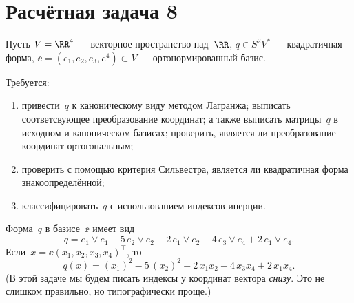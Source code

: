\section{Расчётная задача 8}

Пусть $V = \RR^4$ --- векторное пространство над~$\RR$, $q \in S^2V^*$ --- квадратичная форма, $\ee = (e_1, e_2, e_3, e^4) \subset V$ --- ортонормированный базис.

Требуется:
\begin{enumerate}[1)]
	\item привести~$q$ к каноническому виду методом Лагранжа; выписать соответсвующее преобразование координат; а также выписать матрицы~$q$ в исходном и каноническом базисах; проверить, является ли преобразование координат ортогональным;
	\item проверить с помощью критерия Сильвестра, является ли  квадратичная форма знакоопределённой;
	\item классифицировать~$q$ с использованием индексов инерции.
\end{enumerate}

Форма~$q$ в базисе~$\ee$ имеет вид
\[
	q =
	e_1 \vee e_1
	-
	5\,
	e_2 \vee e_2
	+
	2\,
	e_1 \vee e_2
	-
	4\,
	e_3 \vee e_4
	+
	2\,
	e_1 \vee e_4
	.
\]
Если~$x = \ee (x_1, x_2, x_3, x_4)^\top$, то
\[
	q(x)
	=
	(x_1)^2 - 5\,(x_2)^2 + 2\,x_1 x_2 - 4\,x_3 x_4 + 2\,x_1 x_4
	.
\]
(В этой задаче мы будем писать индексы у координат вектора \emph{снизу}. Это не слишком правильно, но типографически проще.)

